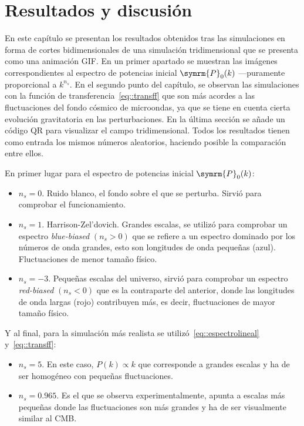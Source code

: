 \chapter{Resultados y discusión}
En este capítulo se presentan los resultados obtenidos tras las simulaciones en forma de cortes bidimensionales de una simulación tridimensional que se presenta como una animación GIF. En un primer apartado se muestran las imágenes correspondientes al espectro de potencias inicial \(\symrm{P}_0(k)\) ---puramente proporcional a \(k^{n_s}\). En el segundo punto del capítulo, se observan las simulaciones con la función de transferencia~\eqref{eq::transff} que son más acordes a las fluctuaciones del fondo cósmico de microondas, ya que se tiene en cuenta cierta evolución gravitatoria en las perturbaciones. En la última sección se añade un código QR para visualizar el campo tridimensional. Todos los resultados tienen como entrada los mismos números aleatorios, haciendo posible la comparación entre ellos.

En primer lugar para el espectro de potencias inicial \(\symrm{P}_0(k)\):
\begin{itemize}
    \item \(n_s=0\). Ruido blanco, el fondo sobre el que se perturba. Sirvió para comprobar el funcionamiento.
    \item \(n_s=1\). Harrison-Zel'dovich. Grandes escalas, se utilizó para comprobar un espectro \textit{blue-biased} \((n_s>0)\) que se refiere a un espectro dominado por los números de onda grandes, esto son longitudes de onda pequeñas (azul). Fluctuaciones de menor tamaño físico.
    \item \(n_s=-3\). Pequeñas escalas del universo, sirvió para comprobar un espectro \textit{red-biased} \((n_s<0)\) que es la contraparte del anterior, donde las longitudes de onda largas (rojo) contribuyen más, es decir, fluctuaciones de mayor tamaño físico.
\end{itemize}
Y al final, para la simulación más realista se utilizó~\eqref{eq::espectrolineal} y~\eqref{eq::transff}:
\begin{itemize}
    \item \(n_s=5\). En este caso, \(P(k)\propto k\) que corresponde a grandes escalas y ha de ser homogéneo con pequeñas fluctuaciones.
    \item \(n_s=0.965\). Es el que se observa experimentalmente, apunta a escalas más pequeñas donde las fluctuaciones son más grandes y ha de ser visualmente similar al CMB.
\end{itemize}


